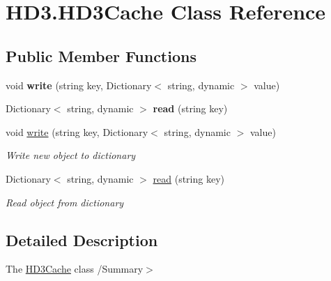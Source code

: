 \hypertarget{class_h_d3_1_1_h_d3_cache}{\section{H\+D3.\+H\+D3\+Cache Class Reference}
\label{class_h_d3_1_1_h_d3_cache}
}
\subsection*{Public Member Functions}
\begin{DoxyCompactItemize}
\item 
\hypertarget{class_h_d3_1_1_h_d3_cache_a9da5b867a04a1a6662d7303450a0daa6}{void {\bfseries write} (string key, Dictionary$<$ string, dynamic $>$ value)}\label{class_h_d3_1_1_h_d3_cache_a9da5b867a04a1a6662d7303450a0daa6}

\item 
\hypertarget{class_h_d3_1_1_h_d3_cache_aee9c64f3dd4ee57f8bc4b552b984761f}{Dictionary$<$ string, dynamic $>$ {\bfseries read} (string key)}\label{class_h_d3_1_1_h_d3_cache_aee9c64f3dd4ee57f8bc4b552b984761f}

\item 
void \hyperlink{class_h_d3_1_1_h_d3_cache_a9da5b867a04a1a6662d7303450a0daa6}{write} (string key, Dictionary$<$ string, dynamic $>$ value)
\begin{DoxyCompactList}\small\item\em Write new object to dictionary \end{DoxyCompactList}\item 
Dictionary$<$ string, dynamic $>$ \hyperlink{class_h_d3_1_1_h_d3_cache_aee9c64f3dd4ee57f8bc4b552b984761f}{read} (string key)
\begin{DoxyCompactList}\small\item\em Read object from dictionary \end{DoxyCompactList}\end{DoxyCompactItemize}


\subsection{Detailed Description}
The \hyperlink{class_h_d3_1_1_h_d3_cache}{H\+D3\+Cache} class /\+Summary$>$ 

